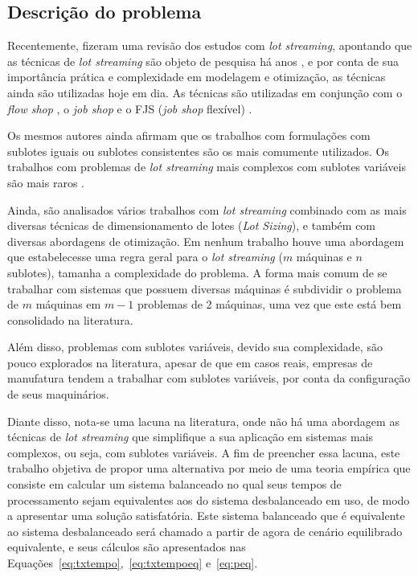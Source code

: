\subsection{Descrição do problema}
Recentemente,  fizeram uma revisão dos estudos com \textit{lot streaming}, apontando que as técnicas de \textit{lot streaming} são objeto de pesquisa há anos \cite{Potts1989, R.Baker1990475, Baker1993}, e por conta de sua importância prática e complexidade em modelagem e otimização, as técnicas ainda são utilizadas hoje em dia. As técnicas são utilizadas em conjunção com o \textit{flow shop} \cite{Potts1989, Liu2003, Biskup2006, Tseng2008, SancarEdis2009, Defersha2010, Defersha2012, Ventura2013, Mortezaei2014}, o \textit{job shop} \cite{Low2004773, Chan2008321, Petrovic2008275,SancarEdis2009442, Lei20134930} e o FJS (\textit{job shop} flexível) \cite{Bai2009, Defersha20122331, Calleja201493, Demir20143905, Rohaninejad2015, Bozek201621}. 

Os mesmos autores ainda afirmam que os trabalhos com formulações com sublotes iguais \cite{Potts1989, Chan2004472, Chan2008321, Low2004773, Tseng2008, SancarEdis2009442, Pan2012166, Ventura2013, Calleja201493} ou sublotes consistentes \cite{Potts1989, Low2004773, Chan2008321, SancarEdis2009, Bai2009, Defersha2012, Lei20134930, Demir20143905} são os mais comumente utilizados. Os trabalhos com problemas de \textit{lot streaming} mais complexos com sublotes variáveis são mais raros \cite{Liu2003, Biskup2006, Petrovic2008275, Defersha2010, Mortezaei2014}. 

Ainda, são analisados vários trabalhos com \textit{lot streaming} combinado com as mais diversas técnicas de dimensionamento de lotes (\textit{Lot Sizing}), e também com diversas abordagens de otimização. Em nenhum trabalho houve uma abordagem que estabelecesse uma regra geral para o \textit{lot streaming} ($m$ máquinas e $n$ sublotes), tamanha a complexidade do problema. A forma mais comum de se trabalhar com sistemas que possuem diversas máquinas é subdividir o problema de $m$ máquinas em $m-1$ problemas de 2 máquinas, uma vez que este está bem consolidado na literatura.

Além disso, problemas com sublotes variáveis, devido sua complexidade, são pouco explorados na literatura, apesar de que em casos reais, empresas de manufatura tendem a trabalhar com sublotes variáveis, por conta da configuração de seus maquinários. 

Diante disso, nota-se uma lacuna na literatura, onde não há uma abordagem as técnicas de \textit{lot streaming} que simplifique a sua aplicação em sistemas mais complexos, ou seja, com sublotes variáveis. A fim de preencher essa lacuna, este trabalho objetiva de propor uma alternativa por meio de uma teoria empírica que consiste em calcular um sistema balanceado no qual seus tempos de processamento sejam equivalentes aos do sistema desbalanceado em uso, de modo a apresentar uma solução satisfatória. Este sistema balanceado que é equivalente ao sistema desbalanceado será chamado a partir de agora de cenário equilibrado equivalente, e seus cálculos são apresentados nas Equações~\ref{eq:txtempo},~\ref{eq:txtempoeq} e~\ref{eq:peq}.

